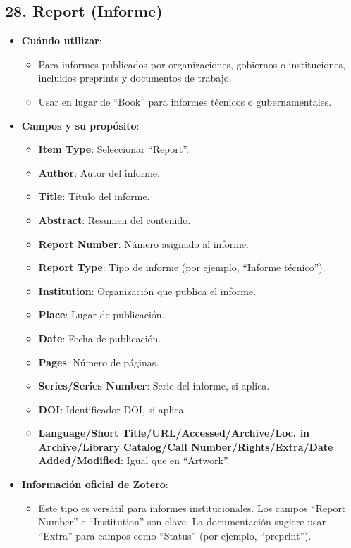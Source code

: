 \documentclass[
  jou,
  floatsintext,
  longtable,
  a4paper,
  nolmodern,
  notxfonts,
  notimes,
  colorlinks=true,linkcolor=blue,citecolor=blue,urlcolor=blue]{apa7}
\providecommand{\tightlist}{%
  \setlength{\itemsep}{0pt}\setlength{\parskip}{0pt}}
\begin{document}
\subsection{28. Report (Informe)}\label{report-informe}

\begin{itemize}
\tightlist
\item
  \textbf{Cuándo utilizar}:

  \begin{itemize}
  \tightlist
  \item
    Para informes publicados por organizaciones, gobiernos o
    instituciones, incluidos preprints y documentos de trabajo.
  \item
    Usar en lugar de ``Book'' para informes técnicos o gubernamentales.
  \end{itemize}
\item
  \textbf{Campos y su propósito}:

  \begin{itemize}
  \tightlist
  \item
    \textbf{Item Type}: Seleccionar ``Report''.
  \item
    \textbf{Author}: Autor del informe.
  \item
    \textbf{Title}: Título del informe.
  \item
    \textbf{Abstract}: Resumen del contenido.
  \item
    \textbf{Report Number}: Número asignado al informe.
  \item
    \textbf{Report Type}: Tipo de informe (por ejemplo, ``Informe
    técnico'').
  \item
    \textbf{Institution}: Organización que publica el informe.
  \item
    \textbf{Place}: Lugar de publicación.
  \item
    \textbf{Date}: Fecha de publicación.
  \item
    \textbf{Pages}: Número de páginas.
  \item
    \textbf{Series/Series Number}: Serie del informe, si aplica.
  \item
    \textbf{DOI}: Identificador DOI, si aplica.
  \item
    \textbf{Language/Short Title/URL/Accessed/Archive/Loc. in
    Archive/Library Catalog/Call Number/Rights/Extra/Date
    Added/Modified}: Igual que en ``Artwork''.
  \end{itemize}
\item
  \textbf{Información oficial de Zotero}:

  \begin{itemize}
  \tightlist
  \item
    Este tipo es versátil para informes institucionales. Los campos
    ``Report Number'' e ``Institution'' son clave. La documentación
    sugiere usar ``Extra'' para campos como ``Status'' (por ejemplo,
    ``preprint'').
  \end{itemize}
\end{itemize}
\end{document}
